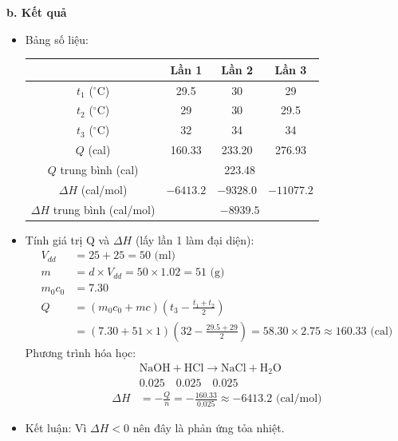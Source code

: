 \textbf{b. Kết quả}
\begin{itemize}
    \item Bảng số liệu:
    \begin{table}[H]
        \centering
        \begin{tabular}{|c|c|c|c|}
            \hline
            & \textbf{Lần 1} & \textbf{Lần 2} & \textbf{Lần 3} \\
            \hline
            $t_1$ ($^\circ$C) & 29.5 & 30 & 29 \\
            \hline
            $t_2$ ($^\circ$C) & 29 & 30 & 29.5 \\
            \hline
            $t_3$ ($^\circ$C) & 32 & 34 & 34 \\
            \hline
            $Q$ (cal) & 160.33 & 233.20 & 276.93 \\
            \hline
            $Q$ trung bình (cal) & \multicolumn{3}{c|}{223.48} \\
            \hline
            $\Delta H$ (cal/mol) & $-6413.2$ & $-9328.0$ & $-11077.2$ \\
            \hline
            $\Delta H$ trung bình (cal/mol) & \multicolumn{3}{c|}{$-8939.5$} \\
            \hline
        \end{tabular}
    \end{table}
    \item Tính giá trị Q và $\Delta H$ (lấy lần 1 làm đại diện):
    \begin{align*}
        V_{dd} &= 25 + 25 = 50 \text{ (ml)} \\
        m &= d \times V_{dd} = 50 \times 1.02 = 51 \text{ (g)} \\
        m_0c_0 &= 7.30 \\
        Q &= (m_0c_0 + mc)\left(t_3 - \frac{t_1 + t_2}{2}\right) \\
          &= (7.30 + 51 \times 1)\left(32 - \frac{29.5 + 29}{2}\right) = 58.30 \times 2.75 \approx 160.33 \text{ (cal)}
    \end{align*}
    Phương trình hóa học:
    \begin{align*}
        &\text{NaOH} + \text{HCl} \rightarrow \text{NaCl} + \text{H}_2\text{O} \\
        &0.025 \quad 0.025 \quad 0.025 \\
        \Delta H &= -\frac{Q}{n} = -\frac{160.33}{0.025} \approx -6413.2 \text{ (cal/mol)}
    \end{align*}
    \item Kết luận: Vì $\Delta H < 0$ nên đây là phản ứng tỏa nhiệt.
\end{itemize}

